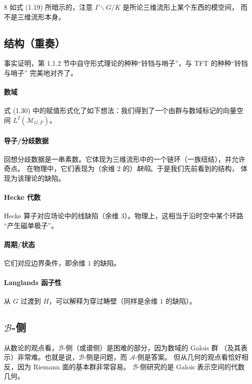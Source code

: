 \begin{srcrem}{8}
如式 (1.19) 所暗示的，注意 $\Gamma\backslash G/K$ 是所论三维流形上某个东西的模空间，
而不是三维流形本身。
\end{srcrem}

\subsection{结构（重奏）}

事实证明，第 1.1.2 节中自守形式理论的种种“铃铛与哨子”，与 TFT 的种种“铃铛与哨子”
完美地对齐了。

\paragraph{数域}
式 (1.30) 中的赋值形式化了如下想法：我们得到了一个由群与数域标记的向量空间
$L^2(\mathcal{M}_{G,F})$。

\paragraph{导子/分歧数据}
回想分歧数据是一串素数。它体现为三维流形中的一个链环（一族纽结），并允许奇点。
在物理中，它们表现为（余维 $2$ 的）\emph{缺陷}。于是我们先前看到的结构，
体现为该理论的缺陷。

\paragraph{Hecke 代数}
Hecke 算子对应场论中的线缺陷（余维 $3$）。物理上，这相当于沿时空中某个环路
“产生磁单极子”。

\paragraph{周期/状态}
它们对应边界条件，即余维 $1$ 的缺陷。

\paragraph{Langlands 函子性}
从 $G$ 过渡到 $H$，可以解释为穿过畴壁（同样是余维 $1$ 的缺陷）。

\subsection{$\mathcal{B}$-侧}

从数论的观点看，$\mathcal{B}$-侧（或谱侧）是困难的部分，因为数域的 Galois 群
（及其表示）非常难。也就是说，$\mathcal{B}$-侧是问题，而 $\mathcal{A}$-侧是答案。
但从几何的观点看恰好相反，因为 Riemann 面的基本群非常容易。
$\mathcal{B}$-侧研究的是 Galois 表示空间的代数几何。

